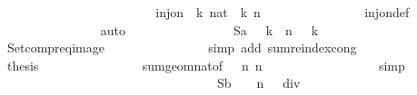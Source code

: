 \begin{isabellebody}
\ \ \ \ \ \ \ \ \ \ \isamarkupfalse%
{\isacharminus}\isanewline
\ \ \ \ \ \ \ \ \ \ \ \ \isamarkupfalse%
\ {\isachardoublequoteopen}inj{\isacharunderscore}on\ {\isacharparenleft}{\isasymlambda}\ k{\isachardot}\ {\isacharparenleft}{}{\isacharcolon}{\isacharcolon}nat{\isacharparenright}\ {\isacharcircum}\ k{\isacharparenright}\ {\isacharbraceleft}{}{\isachardot}{\isachardot}{\isacharless}n{\isacharbraceright}{\isachardoublequoteclose}\isanewline
\ \ \ \ \ \ \ \ \ \ \ \ \ \ \isamarkupfalse%
\ inj{\isacharunderscore}on{\isacharunderscore}def\isanewline
\ \ \ \ \ \ \ \ \ \ \ \ \ \ \isamarkupfalse%
\ auto\isanewline
\ \ \ \ \ \ \ \ \ \ \ \ \isamarkupfalse%
\ \isamarkupfalse%
\ {\isachardoublequoteopen}{\isasymSum}\ {\isacharquery}Sa\ {\isacharequal}\ {\isacharparenleft}{\isasymSum}\ k\ {\isasymin}\ {\isacharbraceleft}{}{\isachardot}{\isachardot}{\isacharless}n{\isacharbraceright}{\isachardot}\ {}\ {\isacharcircum}\ k{\isacharparenright}{\isachardoublequoteclose}\isanewline
\ \ \ \ \ \ \ \ \ \ \ \ \ \ \isamarkupfalse%
\ Setcompr{\isacharunderscore}eq{\isacharunderscore}image\isanewline
\ \ \ \ \ \ \ \ \ \ \ \ \ \ \isamarkupfalse%
\ {\isacharparenleft}simp\ add{\isacharcolon}\ sum{\isachardot}reindex{\isacharunderscore}cong{\isacharparenright}\isanewline
\ \ \ \ \ \ \ \ \ \ \ \ \isamarkupfalse%
\ {\isacharquery}thesis\isanewline
\ \ \ \ \ \ \ \ \ \ \ \ \ \ \isamarkupfalse%
\ sum{\isacharunderscore}geom{\isacharunderscore}nat{\isacharprime}{\isacharbrackleft}of\ {}\ {}\ n{\isacharbrackright}\ {\isacharbackquoteopen}n\ {\isasymge}\ {}{\isacharbackquoteclose}\isanewline
\ \ \ \ \ \ \ \ \ \ \ \ \ \ \isamarkupfalse%
\ simp\isanewline
\ \ \ \ \ \ \ \ \ \ \isamarkupfalse%
\isanewline
\isanewline
\ \ \ \ \ \ \ \ \ \ \isamarkupfalse%
\isanewline
\isanewline
\ \ \ \ \ \ \ \ \ \ \isamarkupfalse%
\ {\isachardoublequoteopen}{\isasymSum}\ {\isacharquery}Sb\ {\isacharequal}\ {}\ {\isacharasterisk}\ {\isacharparenleft}{\isacharparenleft}{}{\isacharcircum}n\ {\isacharminus}\ {}{\isacharparenright}\ div\ {}\ {\isacharminus}\ {}{\isacharparenright}{\isachardoublequoteclose}\isanewline
\ \ \ \ \ \ \ \ \ \ \isamarkupfalse%
{\isacharminus}\isanewline
\ \ \ \ \ \ \ \ \ \ \ \ \isamarkupfalse%

\end{isabellebody}
